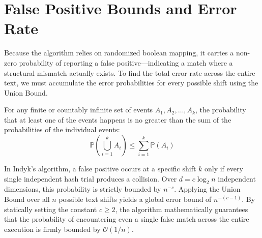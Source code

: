 \section{False Positive Bounds and Error Rate}
Because the algorithm relies on randomized boolean mapping, it carries a non-zero probability of reporting a false positive—indicating a match where a structural mismatch actually exists. To find the total error rate across the entire text, we must accumulate the error probabilities for every possible shift using the Union Bound.

\begin{lemma}
For any finite or countably infinite set of events $A_1, A_2, \dots, A_k$, the probability that at least one of the events happens is no greater than the sum of the probabilities of the individual events:
\begin{equation}
    \mathbb{P}\left( \bigcup_{i=1}^k A_i \right) \le \sum_{i=1}^k \mathbb{P}(A_i)
\end{equation}
\end{lemma}

In Indyk's algorithm, a false positive occurs at a specific shift $k$ only if every single independent hash trial produces a collision. Over $d = c \log_2 n$ independent dimensions, this probability is strictly bounded by $n^{-c}$. Applying the Union Bound over all $n$ possible text shifts yields a global error bound of $n^{-(c-1)}$. By statically setting the constant $c \ge 2$, the algorithm mathematically guarantees that the probability of encountering even a single false match across the entire execution is firmly bounded by $\mathcal{O}(1/n)$.